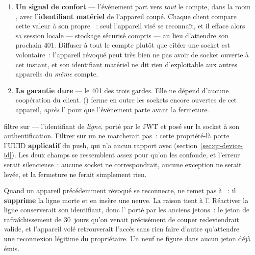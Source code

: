 \begin{enumerate}[leftmargin=1.6em]
  \item \textbf{Un signal de confort} --- l'événement  part vers \emph{tout} le compte, dans la room
        , avec l'\textbf{identifiant matériel} de
        l'appareil coupé. Chaque client compare cette
        valeur à son propre ~: seul l'appareil visé se
        reconnaît, et il efface alors sa session locale --- stockage sécurisé compris ---
        au lieu d'attendre son prochain 401. Diffuser à tout le compte plutôt que cibler
        une socket est
        volontaire~: l'appareil révoqué peut très bien ne pas avoir de socket ouverte à cet
        instant, et son identifiant matériel ne dit rien d'exploitable aux autres appareils
        du \emph{même} compte.
  \item \textbf{La garantie dure} --- le 401 des trois gardes. Elle ne dépend d'aucune
        coopération du client. 
        () ferme en outre les sockets encore ouvertes
        de cet appareil, \emph{après} l' pour que l'événement parte avant la
        fermeture.
\end{enumerate}

\begin{alerte}
 filtre sur  --- l'identifiant de
\emph{ligne}, porté par le JWT et posé sur la socket à son authentification. Filtrer sur un
 ne marcherait pas~: cette propriété-là porte l'UUID
\textbf{applicatif} du push, qui n'a aucun rapport avec 
(section~\ref{sec:qr-device-id}). Les deux champs se ressemblent assez pour qu'on les
confonde, et l'erreur serait silencieuse~: aucune socket ne correspondrait, aucune
exception ne serait levée, et la fermeture ne ferait simplement rien.
\end{alerte}

\begin{alerte}
Quand un appareil précédemment révoqué se reconnecte,  ne remet pas  à ~: il \textbf{supprime} la ligne
morte et en insère une neuve. La raison tient à l'. Réactiver la ligne
conserverait son identifiant, donc l' porté par les anciens jetons~: le
jeton de rafraîchissement de 30~jours qu'on venait précisément de couper redeviendrait
valide, et l'appareil volé retrouverait l'accès sans rien faire d'autre qu'attendre une
reconnexion légitime du propriétaire. Un  neuf ne figure dans aucun jeton déjà
émis.
\end{alerte}

